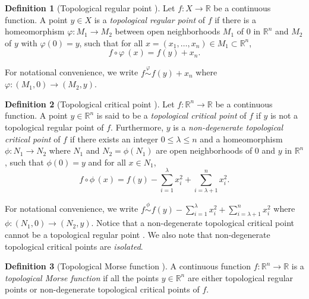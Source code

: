 \documentclass[11pt]{article}
\newcommand{\R}{\mathbb{R}}
\theoremstyle{plain}
\theoremstyle{definition}
\newtheorem{defi}{Definition}
\theoremstyle{remark}
\begin{document}
	\begin{defi}[Topological regular point \citep{morse_topologically_1959}]
		\label{def:topological_regular_point}
		Let $f : X \to \R$ be a continuous function. A point $y \in X$ is a \emph{topological regular point} of $f$ if there is a homeomorphism $\varphi : M_1 \to M_2$ between open neighborhoods $M_1$ of $0$ in $\R^n$ and $M_2$ of $y$ with $\varphi(0) = y$, such that for all $x = (x_1, \ldots, x_n) \in M_1 \subset \R^n$, 
		\begin{equation}\label{eq:topregpoint}
			f \circ \varphi \ (x) = f(y) + x_n.
		\end{equation}
	\end{defi}
	
	For notational convenience, we write $f \overset{\varphi}{\sim} f(y) + x_n$ where $\varphi : (M_1, 0) \to (M_2, y)$.
	
	\begin{defi}[Topological critical point \citep{morse_topologically_1959}]
		\label{def:topological_critical_point}
		Let $f : \R^n \to \R$ be a continuous function. 
		A point $y \in \R^n$ is said to be a \emph{topological critical point} of $f$ if $y$ is not a topological regular point of $f$. Furthermore, $y$ is a \emph{non-degenerate topological critical point} of $f$ if there exists an integer $0 \leq \lambda \leq n$ and a homeomorphism $\phi : N_1 \to N_2$ where $N_1$ and $N_2 = \phi(N_1)$ are open neighborhoods of $0$ and $y$ in $\R^n$, such that $\phi(0) = y$ and for all $x \in N_1$,
		\[f \circ \phi \,(x) = f(y) - \sum_{i = 1}^{\lambda} x_i^2 + \sum_{i = \lambda + 1}^n x_i^2.\]
	\end{defi}
	For notational convenience, we write $f \overset{\phi}{\sim} f(y) - \sum_{i = 1}^{\lambda} x_i^2 + \sum_{i = \lambda + 1}^n x_i^2$ where $\phi : (N_1, 0) \to (N_2, y)$.
	Notice that a non-degenerate topological critical point cannot be a topological regular point \citep{morse_topologically_1959}. We also note that non-degenerate topological critical points are \textit{isolated}. 
	
	
	
	\begin{defi}[Topological Morse function \citep{morse_topologically_1959}]
		\label{def:topological_morse_function}
		A continuous function $f : \R^n \to \R$ is a \emph{topological Morse function} if all the points $y \in \R^n$ are either topological regular points or non-degenerate topological critical points of $f$.
	\end{defi}
	
\end{document}
